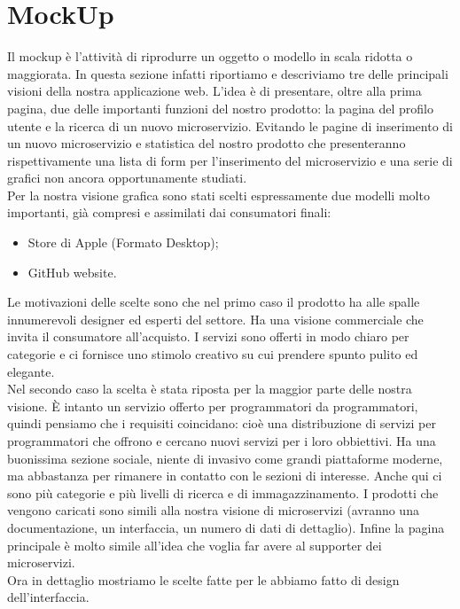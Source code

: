 \section{MockUp}{
	Il mockup è l'attività di riprodurre un oggetto o modello in scala ridotta o maggiorata. In questa sezione infatti riportiamo e descriviamo tre delle principali visioni della nostra applicazione web. L'idea è di presentare, oltre alla prima pagina, due delle importanti funzioni del nostro prodotto: la pagina del profilo utente e la ricerca di un nuovo microservizio. Evitando le pagine di inserimento di un nuovo microservizio e statistica del nostro prodotto che presenteranno rispettivamente una lista di form per l'inserimento del microservizio e una serie di grafici non ancora opportunamente studiati.\\
	Per la nostra visione grafica sono stati scelti espressamente due modelli molto importanti, già compresi e assimilati dai consumatori finali:
	\begin{itemize}
		\item Store di Apple (Formato Desktop);
		\item GitHub website.
	\end{itemize}
	Le motivazioni delle scelte sono che nel primo caso il prodotto ha alle spalle innumerevoli designer ed esperti del settore. Ha una visione commerciale che invita il consumatore all'acquisto. I servizi sono offerti in modo chiaro per categorie e ci fornisce uno stimolo creativo su cui prendere spunto pulito ed elegante.\\
	Nel secondo caso la scelta è stata riposta per la maggior parte delle nostra visione. È intanto un servizio offerto per programmatori da programmatori, quindi pensiamo che i requisiti coincidano: cioè una distribuzione di servizi per programmatori che offrono e cercano nuovi servizi per i loro obbiettivi. Ha una buonissima sezione sociale, niente di invasivo come grandi piattaforme moderne, ma abbastanza per rimanere in contatto con le sezioni di interesse. Anche qui ci sono più categorie e più livelli di ricerca e di immagazzinamento. I prodotti che vengono caricati sono simili alla nostra visione di microservizi (avranno una documentazione, un interfaccia, un numero di dati di dettaglio). Infine la pagina principale è molto simile all'idea che voglia far avere al supporter dei microservizi.\\ 
	Ora in dettaglio mostriamo le scelte fatte per le abbiamo fatto di design dell'interfaccia.
	
}
